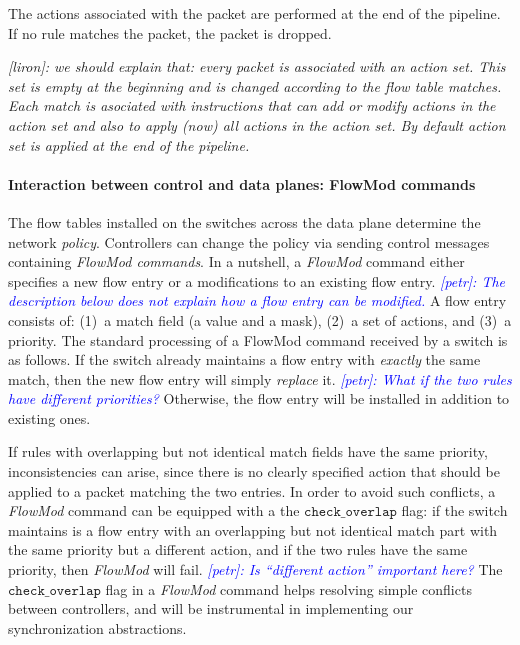 \documentclass[conference]{sigcomm-alternate}
\newcommand{\checko}{\texttt{check\_overlap}\xspace}
\newcommand{\liron}[1]{\textit{\textcolor{mygreen}{[liron]: #1}}} %
\newcommand{\petr}[1]{\textit{\textcolor{blue}{[petr]: #1}}} %
\begin{document}
The actions associated with the packet are performed at the end of the pipeline.
If no rule matches the packet, the packet is dropped.

\liron{we should explain that: every packet is associated with an
  action set. This set is empty at the beginning and is changed
  according to the flow table matches. Each match is asociated with
  instructions that can add or modify actions in the action set and
  also to apply (now) all actions in the action set. By default action
  set is applied at the end of the pipeline.}



\paragraph{Interaction between control and data planes: FlowMod commands}
The flow tables installed on the switches across the data plane
determine the network \emph{policy}.
Controllers can change the policy via sending  
control messages containing \emph{FlowMod commands}.
In a nutshell, a \emph{FlowMod} command either specifies a new flow entry or
a modifications to an existing flow entry. \petr{The description below
  does not explain how a flow entry can be modified.}  
A flow entry consists of: (1)~a match 
field
(a value and a mask), (2)~a set of actions, and (3)~a priority.
The standard processing of a FlowMod command received by a switch is
as follows. 
If the switch already maintains a flow entry with \emph{exactly} the
same match, then the new flow entry will simply \emph{replace} it.
\petr{What if the two rules have different priorities?}
Otherwise, the flow entry will be installed in addition to existing ones. 

If rules with overlapping but not identical match fields have the same priority, 
inconsistencies can arise, since there is no clearly specified action
that should be applied to a packet matching the two entries.
In order to avoid such conflicts, a \emph{FlowMod} command can be equipped with a the $\checko$ flag:
if the switch maintains is a flow entry with an overlapping but not
identical match part with the same priority but a different action,
 and if the two rules have the same priority, then
\emph{FlowMod} will fail.
\petr{Is ``different action'' important here?}
The $\checko$ flag in a \emph{FlowMod} command helps resolving simple
conflicts between controllers, and will be instrumental
in implementing our synchronization abstractions.  
\end{document}
